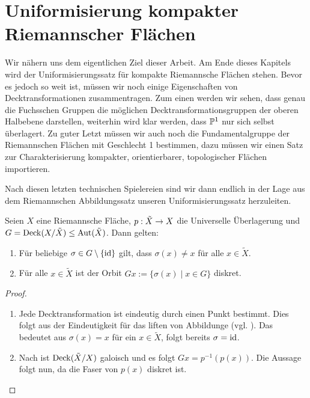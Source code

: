 \section{Uniformisierung kompakter Riemannscher Flächen}
\label{sec:uniformisierung}

Wir nähern uns dem eigentlichen Ziel dieser Arbeit. Am Ende dieses
Kapitels wird der Uniformisierungssatz für kompakte Riemannsche
Flächen stehen. Bevor es jedoch so weit ist, müssen wir noch einige
Eigenschaften von Decktransformationen zusammentragen. Zum einen
werden wir sehen, dass genau die Fuchsschen Gruppen die möglichen
Decktransformationsgruppen der oberen Halbebene darstellen, weiterhin
wird klar werden, dass $\P^1$ nur sich selbst überlagert. Zu guter
Letzt müssen wir auch noch die Fundamentalgruppe der Riemannschen
Flächen mit Geschlecht 1 bestimmen, dazu müssen wir einen Satz zur
Charakterisierung kompakter, orientierbarer, topologischer Flächen
importieren.

Nach diesen letzten technischen Spielereien sind wir dann endlich in
der Lage aus dem Riemannschen Abbildungssatz unseren
Uniformisierungssatz herzuleiten.

\begin{lemma}
  \label{lemma:decktrafo-diskret}
  Seien $X$ eine Riemannsche Fläche, $p: \tilde X \ra X$ die
  Universelle Überlagerung und $G = \Deck(X /\tilde X) \leq
  \Aut(\tilde X)$. Dann gelten:
  \begin{enumerate}
  \item Für beliebige $\sigma \in G \setminus \{\id\}$ gilt, dass $\sigma
    (x) \neq x $ für alle $x \in \tilde X$.
  \item Für alle $x \in \tilde X$ ist der Orbit $Gx := \{ \sigma(x)
    \mid x \in G\}$ diskret.
  \end{enumerate}
\end{lemma}

\begin{proof}
  \begin{enumerate}
  \item Jede Decktransformation ist eindeutig durch einen Punkt
    bestimmt. Dies folgt aus der Eindeutigkeit für das liften von
    Abbildunge (vgl. \cite[Satz 4.8]{For}). Das bedeutet aus
    $\sigma(x) = x$ für ein $x \in \tilde X$, folgt
    bereits $\sigma = \id$.
  \item Nach \cite[Satz 5.6]{For} ist $\Deck(\tilde X/X)$ galoisch und
    es folgt $Gx = p^{-1}(p(x))$. Die Aussage folgt nun, da die Faser
    von $p(x)$ diskret ist.
  \end{enumerate}
\end{proof}

